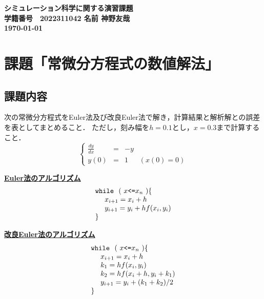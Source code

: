 \documentclass{jarticle}
\begin{document}
\vfill
\begin{screen}
\begin{center}
\huge\bf シミュレーション科学に関する演習課題\\
\vspace{5mm}
\large\bf
学籍番号　2022311042 \quad 名前 神野友哉\\
\today
\end{center}
\end{screen}
\thispagestyle{empty}

%
\section{課題「常微分方程式の数値解法」}
\subsection{課題内容}
次の常微分方程式をEuler法及び改良Euler法で解き，計算結果と解析解との誤差を表としてまとめること．
ただし，刻み幅を$h=0.1$とし，$x=0.3$まで計算すること．
$$
\left\{ \begin{array}{ccl}\displaystyle
                \frac{dy}{dx} & = & -y \\
                y(0)& = & 1 ~~~~~~~(x(0)=0)
        \end{array}
\right.
$$

\begin{screen}
\underline{\bf Euler法のアルゴリズム}
$$
\begin{array}{l}
\mbox{\tt while}~~(~ x \mbox{\tt <=} x_n ~) \{ \\
~~~~x_{i+1} = x_{i} + h \\
~~~~y_{i+1} = y_{i} + h f(x_i,y_i) \\
   \}
\end{array}
$$
\end{screen}

\begin{screen}
\underline{\bf 改良Euler法のアルゴリズム}
$$
\begin{array}{l}
\mbox{\tt while}~~(~ x \mbox{\tt <=} x_n ~) \{ \\
~~~~x_{i+1} = x_{i} + h \\
~~~~k_1 = h f(x_i,y_i) \\
~~~~k_2 = h f(x_i+h,y_i+k_1) \\
~~~~y_{i+1} = y_{i} + (k_1 + k_2) / 2\\
   \}
\end{array}
$$
\end{screen}
\end{document}

